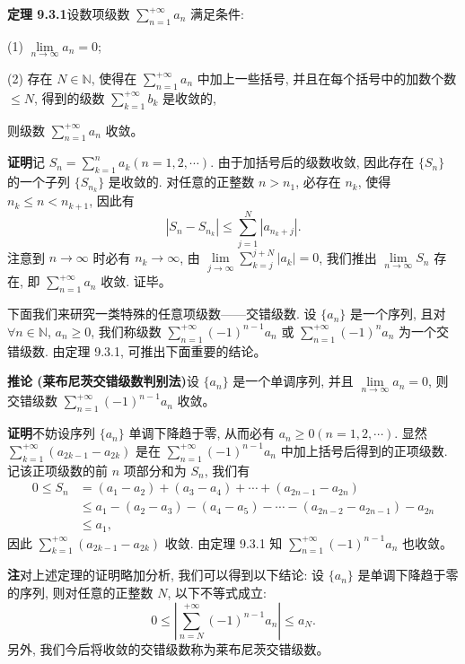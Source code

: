 \documentclass[UTF8,12pt,a4paper,fontset=fandol]{ctexart}
\begin{document}
\noindent\textbf{定理 9.3.1}\quad 设数项级数 $\sum\limits_{n=1}^{+\infty}a_n$ 满足条件:

(1) $\lim\limits_{n\to\infty}a_n=0$;

(2) 存在 $N\in\mathbb{N}$, 使得在 $\sum\limits_{n=1}^{+\infty}a_n$ 中加上一些括号, 并且在每个括号中的加数个数 $\leq N$, 得到的级数 $\sum\limits_{k=1}^{+\infty}b_k$ 是收敛的,

则级数 $\sum\limits_{n=1}^{+\infty}a_n$ 收敛。

\noindent\textbf{证明}\quad 记 $S_n=\sum\limits_{k=1}^n a_k(n=1,2,\cdots)$. 由于加括号后的级数收敛, 因此存在 $\{S_n\}$ 的一个子列 $\{S_{n_k}\}$ 是收敛的. 对任意的正整数 $n>n_1$, 必存在 $n_k$, 使得 $n_k\leq n<n_{k+1}$, 因此有
\[
  |S_n-S_{n_k}|\leq\sum_{j=1}^N|a_{n_k+j}|.
\]
注意到 $n\to\infty$ 时必有 $n_k\to\infty$, 由 $\lim\limits_{j\to\infty}\sum\limits_{k=j}^{j+N}|a_k|=0$, 我们推出 $\lim\limits_{n\to\infty}S_n$ 存在, 即 $\sum\limits_{n=1}^{+\infty}a_n$ 收敛. 证毕。

下面我们来研究一类特殊的任意项级数——交错级数. 设 $\{a_n\}$ 是一个序列, 且对 $\forall n\in\mathbb{N}$, $a_n\geq0$, 我们称级数 $\sum\limits_{n=1}^{+\infty}(-1)^{n-1}a_n$ 或 $\sum\limits_{n=1}^{+\infty}(-1)^na_n$ 为一个交错级数. 由定理 9.3.1, 可推出下面重要的结论。

\noindent\textbf{推论 (莱布尼茨交错级数判别法)}\quad 设 $\{a_n\}$ 是一个单调序列, 并且 $\lim\limits_{n\to\infty}a_n=0$, 则交错级数 $\sum\limits_{n=1}^{+\infty}(-1)^{n-1}a_n$ 收敛。

\noindent\textbf{证明}\quad 不妨设序列 $\{a_n\}$ 单调下降趋于零, 从而必有 $a_n\geq0(n=1,2,\cdots)$. 显然 $\sum\limits_{k=1}^{+\infty}(a_{2k-1}-a_{2k})$ 是在 $\sum\limits_{n=1}^{+\infty}(-1)^{n-1}a_n$ 中加上括号后得到的正项级数. 记该正项级数的前 $n$ 项部分和为 $S_n$, 我们有
\[
\begin{aligned}
  0\leq S_n
  &=(a_1-a_2)+(a_3-a_4)+\cdots+(a_{2n-1}-a_{2n})\\
  &\leq a_1-(a_2-a_3)-(a_4-a_5)-\cdots-(a_{2n-2}-a_{2n-1})-a_{2n}\\
  &\leq a_1,
\end{aligned}
\]
因此 $\sum\limits_{k=1}^{+\infty}(a_{2k-1}-a_{2k})$ 收敛. 由定理 9.3.1 知 $\sum\limits_{n=1}^{+\infty}(-1)^{n-1}a_n$ 也收敛。

\noindent\textbf{注}\quad 对上述定理的证明略加分析, 我们可以得到以下结论: 设 $\{a_n\}$ 是单调下降趋于零的序列, 则对任意的正整数 $N$, 以下不等式成立:
\[
  0\leq\left|\sum_{n=N}^{+\infty}(-1)^{n-1}a_n\right|\leq a_N.
\]
另外, 我们今后将收敛的交错级数称为莱布尼茨交错级数。
\end{document}
